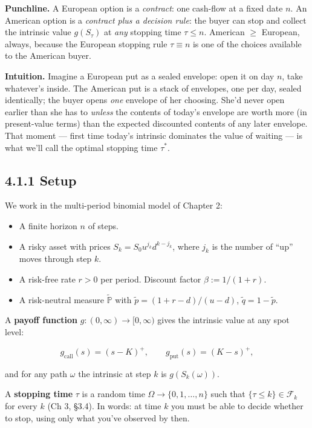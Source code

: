 \documentclass[
  10pt,
  twoside]{book}
\providecommand{\tightlist}{%
  \setlength{\itemsep}{0pt}\setlength{\parskip}{0pt}}
\begin{document}
\textbf{Punchline.} A European option is a \emph{contract}: one
cash-flow at a fixed date \(n\). An American option is a \emph{contract
plus a decision rule}: the buyer can stop and collect the intrinsic
value \(g(S_\tau)\) at \emph{any} stopping time \(\tau \le n\). American
\(\ge\) European, always, because the European stopping rule
\(\tau \equiv n\) is one of the choices available to the American buyer.

\textbf{Intuition.} Imagine a European put as a sealed envelope: open it
on day \(n\), take whatever's inside. The American put is a stack of
envelopes, one per day, sealed identically; the buyer opens \emph{one}
envelope of her choosing. She'd never open earlier than she has to
\emph{unless} the contents of today's envelope are worth more (in
present-value terms) than the expected discounted contents of any later
envelope. That moment --- first time today's intrinsic dominates the
value of waiting --- is what we'll call the optimal stopping time
\(\tau^*\).

\subsection{4.1.1 Setup}\label{setup}

We work in the multi-period binomial model of Chapter 2:

\begin{itemize}
\tightlist
\item
  A finite horizon \(n\) of steps.
\item
  A risky asset with prices \(S_k = S_0 u^{j_k} d^{k - j_k}\), where
  \(j_k\) is the number of ``up'' moves through step \(k\).
\item
  A risk-free rate \(r > 0\) per period. Discount factor
  \(\beta := 1/(1+r)\).
\item
  A risk-neutral measure \(\tilde{\mathbb{P}}\) with
  \(\tilde p = (1 + r - d)/(u - d)\), \(\tilde q = 1 - \tilde p\).
\end{itemize}

A \textbf{payoff function} \(g: (0, \infty) \to [0, \infty)\) gives the
intrinsic value at any spot level:

\[g_{\text{call}}(s) = (s - K)^+, \qquad g_{\text{put}}(s) = (K - s)^+,\]

and for any path \(\omega\) the intrinsic at step \(k\) is
\(g(S_k(\omega))\).

A \textbf{stopping time} \(\tau\) is a random time
\(\Omega \to \{0, 1, \dots, n\}\) such that
\(\{\tau \le k\} \in \mathcal F_k\) for every \(k\) (Ch 3, §3.4). In
words: at time \(k\) you must be able to decide whether to stop, using
only what you've observed by then.
\end{document}
